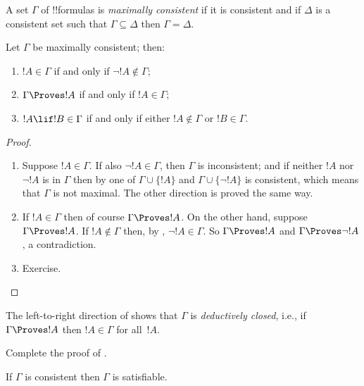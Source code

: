 \documentclass[../../../include/open-logic-section]{subfiles}
\begin{document}

\begin{defn}
A set $\Gamma$ of !!{formula}s is \emph{maximally consistent} if it is
consistent and if $\Delta$ is a consistent set such that $\Gamma
\subseteq \Delta$ then $\Gamma = \Delta$.
\end{defn}

\begin{lem}
Let $\Gamma$ be maximally consistent; then:
\begin{enumerate}
\item {} $!A \in \Gamma$ if and only if $\lnot !A
  \notin \Gamma$;
\item {} $\Gamma \Proves !A$ if and only if $!A \in \Gamma$; 
\item {} $!A \lif !B \in \Gamma$ if and only if
  either $!A \notin \Gamma$ or $!B \in \Gamma$.
\end{enumerate}
\end{lem}

\begin{proof}
\begin{enumerate}
\item Suppose $!A \in \Gamma$. If also $\lnot !A \in \Gamma$, then
  $\Gamma$ is inconsistent; and if neither $!A$ nor $\lnot!A$ is in
  $\Gamma$ then by  one of $\Gamma\cup\{!A\}$ and
  $\Gamma \cup \{\lnot !A\}$ is consistent, which means that $\Gamma$
  is not maximal. The other direction is proved the same way.
\item If $!A \in \Gamma$ then of course $\Gamma \Proves !A$.  On the
  other hand, suppose $\Gamma \Proves !A$. If $!A \notin \Gamma$ then,
  by , $\lnot !A \in \Gamma$.  So $\Gamma \Proves
  !A$ and $\Gamma \Proves \lnot !A$, a contradiction.
\item Exercise.
\end{enumerate}
\end{proof}

The left-to-right direction of  shows that
$\Gamma$ is \emph{deductively closed}, i.e., if $\Gamma \Proves !A$ then $!A
\in \Gamma$ for all~$!A$.

\begin{prob}
  Complete the proof of .
\end{prob}

\begin{thm}[Completeness] 
If $\Gamma$ is consistent then $\Gamma$ is satisfiable.
\end{thm}
\end{document}
